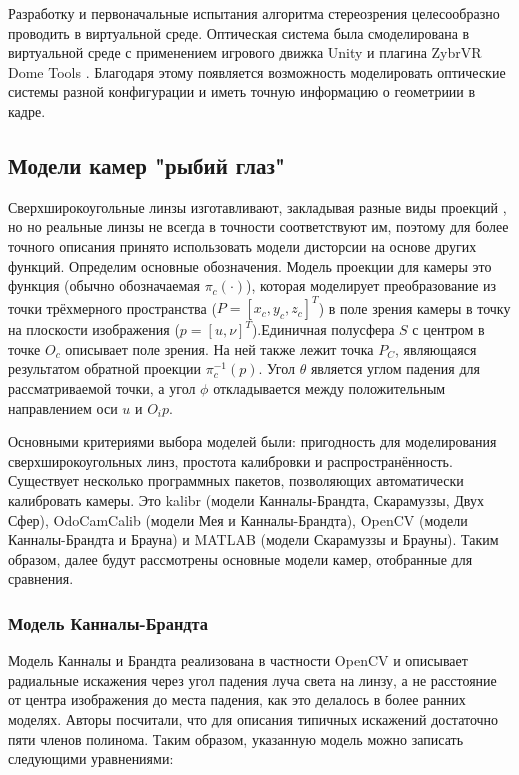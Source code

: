 Разработку и первоначальные испытания алгоритма стереозрения целесообразно проводить в виртуальной среде. Оптическая система была смоделирована 
в виртуальной среде с применением игрового движка Unity и плагина ZybrVR Dome Tools \cite{dome_tools}. Благодаря этому появляется возможность моделировать  %
оптические системы разной конфигурации и иметь точную информацию о геометриии в кадре. 

\subsection{Модели камер "рыбий глаз"}

Сверхширокоугольные линзы изготавливают, закладывая разные виды проекций \cite{projections}, но 
но реальные линзы не всегда в точности соответствуют им, поэтому для более точного описания принято использовать модели дисторсии
 на основе других функций.
Определим основные обозначения. Модель проекции для камеры это функция (обычно обозначаемая $\pi_c(\cdot )$), которая моделирует преобразование 
из точки трёхмерного пространства ($P=[x_c, y_c, z_c]^T$) в поле зрения камеры в точку на плоскости изображения ($p=[u, \nu]^T$).Единичная            %
полусфера $S$ с центром в точке $O_c$ описывает поле зрения. На ней также лежит точка $P_C$, являющаяся результатом обратной проекции $\pi^{-1}_c({p})$.
Угол $\theta$ является углом падения для рассматриваемой точки, а угол $\phi$ откладывается между положительным направлением оси $u$ и $O_{i}{p}$. 

Основными критериями выбора моделей были: пригодность для моделирования 
сверхширокоугольных линз, простота калибровки и распространённость. Существует несколько программных пакетов, позволяющих автоматически калибровать камеры. 
Это kalibr (модели Канналы-Брандта, Скарамуззы, Двух Сфер), OdoCamCalib (модели Мея и Канналы-Брандта), OpenCV (модели Канналы-Брандта и Брауна) и MATLAB 
(модели Скарамуззы и Брауны). Таким образом, далее будут рассмотрены основные модели камер, отобранные для сравнения. 

\subsubsection{Модель Канналы-Брандта}

Модель Канналы и 
Брандта \cite{opencv_model} реализована в частности OpenCV и описывает радиальные искажения через угол падения луча света на линзу, а не расстояние  
от центра изображения до места падения, как это делалось в более ранних моделях. Авторы посчитали, что для описания типичных искажений достаточно 
пяти членов полинома. Таким образом, указанную модель можно записать следующими уравнениями:

